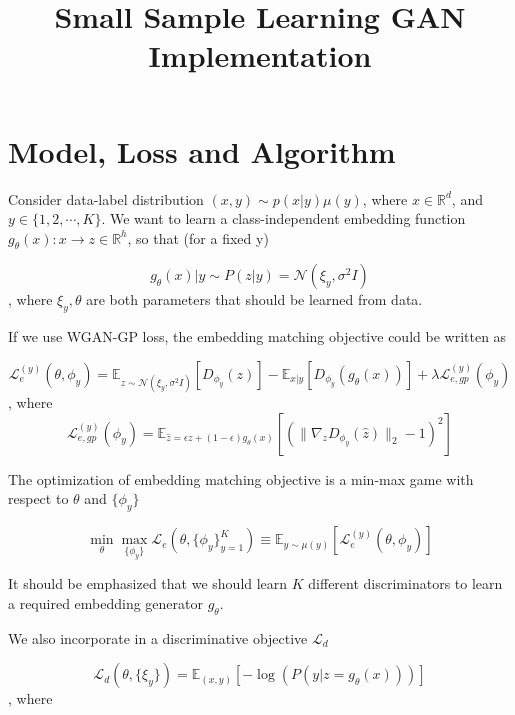 \documentclass{article}
\title{Small Sample Learning GAN Implementation}
\author{}
\begin{document}
\maketitle

\section{Model, Loss and Algorithm}

Consider data-label distribution $(x, y) \sim p(x|y) \mu(y)$, where $x \in \mathbb{R}^d$, and $y \in \{1, 2, \cdots, K\}$. We want to learn a class-independent embedding function $g_\theta(x): x \to z \in \mathbb{R}^h$, so that (for a fixed y)

\begin{equation}
\label{embed-match}
    g_\theta(x) | y \sim P(z|y)=\mathcal{N}(\xi_y, \sigma^2I)
\end{equation}, where $\xi_y, \theta$ are both parameters that should be learned from data.

If we use WGAN-GP loss, the embedding matching objective could be written as 

\begin{equation}
    \mathcal{L}_{e}^{(y)}(\theta, \phi_y) = \mathbb{E}_{z\sim\mathcal{N}(\xi_y, \sigma^2I)}[D_{\phi_y}(z)]-\mathbb{E}_{x|y}[D_{\phi_y}(g_\theta(x))] + \lambda \mathcal{L}_{e, gp}^{(y)}(\phi_y)
\end{equation}, where\begin{equation}
    \mathcal{L}_{e, gp}^{(y)}(\phi_y) = \mathbb{E}_{\hat{z} = \epsilon z + (1 - \epsilon)g_\theta(x)}[ (\|\nabla_z D_{\phi_y}(\hat{z})\|_2 - 1)^2]
\end{equation}

The optimization of embedding matching objective is a min-max game with respect to $\theta$ and $\{\phi_y\}$

\begin{equation}
    \min_{\theta} \max_{\{\phi_y\}} \mathcal{L}_e(\theta, \{\phi_y\}_{y=1}^K) \equiv \mathbb{E}_{y \sim \mu(y)} [\mathcal{L}_{e}^{(y)}(\theta, \phi_y)]
\end{equation}

It should be emphasized that we should learn $K$ different discriminators to learn a required embedding generator $g_\theta$.

We also incorporate in a discriminative objective $\mathcal{L}_{d}$

\begin{equation}
\label{discr-loss}
    \mathcal{L}_d(\theta, \{\xi_y\}) = \mathbb{E}_{(x, y)}[-\log (P(y|z=g_\theta(x)))]
\end{equation}, where 
\end{document}
